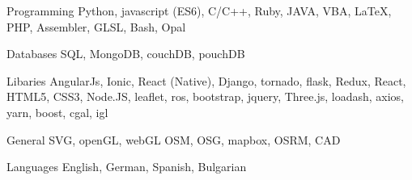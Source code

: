 

\begin{cvskills}

  \cvskill
    {Programming} %
    {Python, javascript (ES6), C/C++, Ruby, JAVA, VBA, LaTeX, PHP, Assembler, GLSL, Bash, Opal} %

  \cvskill
    {Databases} %
    {SQL, MongoDB, couchDB, pouchDB} %

  \cvskill
    {Libaries} %
    {AngularJs, Ionic, React (Native), Django, tornado, flask, Redux, React, HTML5, CSS3, Node.JS, leaflet, ros, bootstrap, jquery, Three.js, loadash, axios, yarn, boost, cgal, igl} %
    
    
  \cvskill
    {General} %
    {SVG, openGL, webGL OSM, OSG, mapbox, OSRM, CAD} %

  \cvskill
    {Languages} %
    {English, German, Spanish, Bulgarian} %

\end{cvskills}
